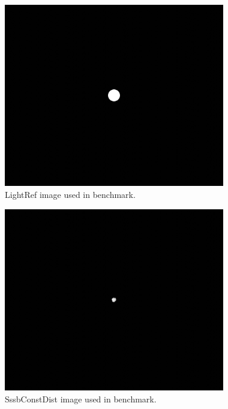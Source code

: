 \begin{figure}[htb]
    \begin{center}
        \includegraphics[height=8cm]{doc/thesis/0_figures/cv_skimage/LightRef_2017-08-15T115851-679000.jpg}
    \end{center}
    \caption{LightRef image used in benchmark.}
    \label{fig:bm_light_ref}
\end{figure}

\begin{figure}[htb]
    \begin{center}
        \includegraphics[height=8cm]{doc/thesis/0_figures/cv_skimage/SssbConstDist_2017-08-15T115851-679000.jpg}
    \end{center}
    \caption{SssbConstDist image used in benchmark.}
    \label{fig:bm_sssbconstdist}
\end{figure}

